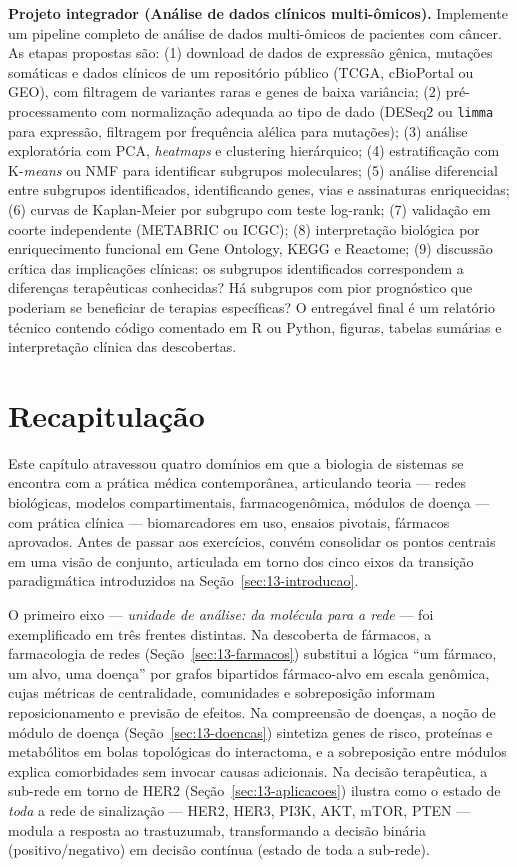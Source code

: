\textbf{Projeto integrador (Análise de dados clínicos multi-ômicos).} Implemente um pipeline completo de análise de dados multi-ômicos de pacientes com câncer. As etapas propostas são: (1) download de dados de expressão gênica, mutações somáticas e dados clínicos de um repositório público (TCGA, cBioPortal ou GEO), com filtragem de variantes raras e genes de baixa variância; (2) pré-processamento com normalização adequada ao tipo de dado (DESeq2 ou \texttt{limma} para expressão, filtragem por frequência alélica para mutações); (3) análise exploratória com PCA, \emph{heatmaps} e clustering hierárquico; (4) estratificação com K-\emph{means} ou NMF para identificar subgrupos moleculares; (5) análise diferencial entre subgrupos identificados, identificando genes, vias e assinaturas enriquecidas; (6) curvas de Kaplan-Meier por subgrupo com teste log-rank; (7) validação em coorte independente (METABRIC ou ICGC); (8) interpretação biológica por enriquecimento funcional em Gene Ontology, KEGG e Reactome; (9) discussão crítica das implicações clínicas: os subgrupos identificados correspondem a diferenças terapêuticas conhecidas? Há subgrupos com pior prognóstico que poderiam se beneficiar de terapias específicas? O entregável final é um relatório técnico contendo código comentado em R ou Python, figuras, tabelas sumárias e interpretação clínica das descobertas.

\section{Recapitulação}
\label{sec:13-recapitulacao}

Este capítulo atravessou quatro domínios em que a biologia de sistemas se encontra com a prática médica contemporânea, articulando teoria --- redes biológicas, modelos compartimentais, farmacogenômica, módulos de doença --- com prática clínica --- biomarcadores em uso, ensaios pivotais, fármacos aprovados. Antes de passar aos exercícios, convém consolidar os pontos centrais em uma visão de conjunto, articulada em torno dos cinco eixos da transição paradigmática introduzidos na Seção~\ref{sec:13-introducao}.

O primeiro eixo --- \emph{unidade de análise: da molécula para a rede} --- foi exemplificado em três frentes distintas. Na descoberta de fármacos, a farmacologia de redes (Seção~\ref{sec:13-farmacos}) substitui a lógica ``um fármaco, um alvo, uma doença'' por grafos bipartidos fármaco-alvo em escala genômica, cujas métricas de centralidade, comunidades e sobreposição informam reposicionamento e previsão de efeitos. Na compreensão de doenças, a noção de módulo de doença (Seção~\ref{sec:13-doencas}) sintetiza genes de risco, proteínas e metabólitos em bolas topológicas do interactoma, e a sobreposição entre módulos explica comorbidades sem invocar causas adicionais. Na decisão terapêutica, a sub-rede em torno de HER2 (Seção~\ref{sec:13-aplicacoes}) ilustra como o estado de \emph{toda} a rede de sinalização --- HER2, HER3, PI3K, AKT, mTOR, PTEN --- modula a resposta ao trastuzumab, transformando a decisão binária (positivo/negativo) em decisão contínua (estado de toda a sub-rede).

